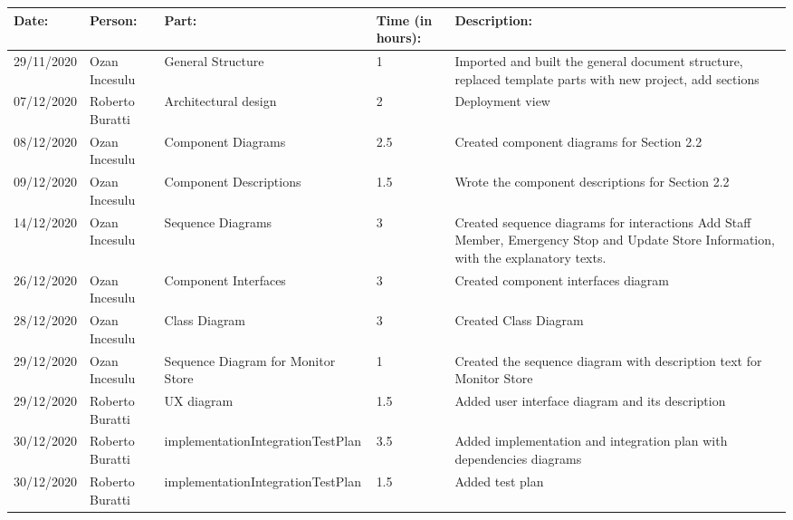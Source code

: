 \begin{table}[h]
    \begin{tabular}{|p{2cm}|p{2cm}|p{2cm}|p{1.5cm}|p{8cm}|}
        \hline

        Date:      & Person:       & Part:             & Time (in hours): & Description:                                       \\ \hline
        29/11/2020 & Ozan Incesulu & General Structure & 1             & Imported and built the general document structure, replaced template parts with new project, add sections\\ \hline
        07/12/2020 & Roberto Buratti & Architectural design & 2                 & Deployment view\\ \hline
        08/12/2020 & Ozan Incesulu & Component Diagrams & 2.5 & Created component diagrams for Section 2.2 \\ \hline
        09/12/2020 & Ozan Incesulu & Component Descriptions & 1.5 & Wrote the component descriptions for Section 2.2 \\ \hline
        14/12/2020 & Ozan Incesulu & Sequence Diagrams& 3 & Created sequence diagrams for interactions Add Staff Member, Emergency Stop and Update Store Information, with the explanatory texts.\\ \hline
        26/12/2020 & Ozan Incesulu & Component Interfaces & 3 & Created component interfaces diagram \\ \hline
        28/12/2020 & Ozan Incesulu & Class Diagram & 3 & Created Class Diagram \\ \hline
        29/12/2020 & Ozan Incesulu & Sequence Diagram for Monitor Store & 1 & Created the sequence diagram with description text for Monitor Store \\ \hline
        29/12/2020 & Roberto Buratti & UX diagram & 1.5                 & Added user interface diagram and its description\\ \hline
        30/12/2020 & Roberto Buratti & implementationIntegrationTestPlan & 3.5                 & Added implementation and integration plan with dependencies diagrams\\ \hline
        30/12/2020 & Roberto Buratti & implementationIntegrationTestPlan & 1.5                 & Added test plan\\ \hline
    \end{tabular}
\end{table}
